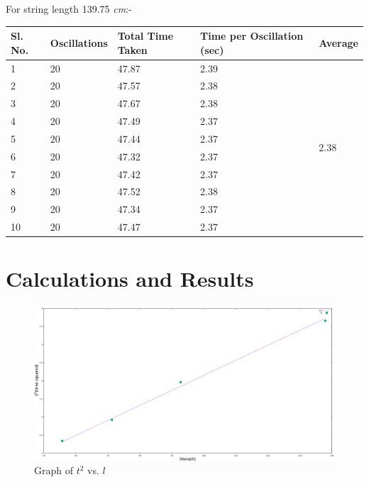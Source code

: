 \documentclass[12pt]{article}
\begin{document}
	For string length 139.75 \emph{cm}:-

	\begin{table}[H]
		\begin{tabular}{|l|l|l|l|l|}
			\hline
			Sl. No. & Oscillations & Total Time Taken & Time per Oscillation (sec) & Average                \\ \hline
			1       & 20           & 47.87            & 2.39                       & \multirow{10}{*}{2.38} \\ \cline{1-4}
			2       & 20           & 47.57            & 2.38                       &                        \\ \cline{1-4}
			3       & 20           & 47.67            & 2.38                       &                        \\ \cline{1-4}
			4       & 20           & 47.49            & 2.37                       &                        \\ \cline{1-4}
			5       & 20           & 47.44            & 2.37                       &                        \\ \cline{1-4}
			6       & 20           & 47.32            & 2.37                       &                        \\ \cline{1-4}
			7       & 20           & 47.42            & 2.37                       &                        \\ \cline{1-4}
			8       & 20           & 47.52            & 2.38                       &                        \\ \cline{1-4}
			9       & 20           & 47.34            & 2.37                       &                        \\ \cline{1-4}
			10      & 20           & 47.47            & 2.37                       &                        \\ \hline
		\end{tabular}
	\end{table}

	\section{Calculations and Results}
	
	\begin{figure}[H]
		\centering
		\includegraphics[scale=0.3]{photo}
		\caption{Graph of $t^{2}$ vs. $l$}
	\end{figure}
\end{document}
